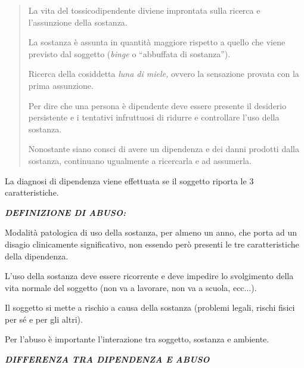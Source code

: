 \documentclass[]{article}
\begin{document}
\begin{quote}
La vita del tossicodipendente diviene improntata sulla ricerca e
l'assunzione della sostanza.

La sostanza è assunta in quantità maggiore rispetto a quello che viene
previsto dal soggetto (\emph{binge} o ``abbuffata di sostanza'').

Ricerca della cosiddetta \emph{luna di miele,} ovvero la sensazione
provata con la prima assunzione.

Per dire che una persona è dipendente deve essere presente il desiderio
persistente e i tentativi infruttuosi di ridurre e controllare l'uso
della sostanza.

Nonostante siano consci di avere un dipendenza e dei danni prodotti
dalla sostanza, continuano ugualmente a ricercarla e ad assumerla.
\end{quote}

La diagnosi di dipendenza viene effettuata se il soggetto riporta le 3
caratteristiche.

\textbf{\emph{DEFINIZIONE DI ABUSO:}}

Modalità patologica di uso della sostanza, per almeno un anno, che porta
ad un disagio clinicamente significativo, non essendo però presenti le
tre caratteristiche della dipendenza.

L'uso della sostanza deve essere ricorrente e deve impedire lo
svolgimento della vita normale del soggetto (non va a lavorare, non va a
scuola, ecc...).

Il soggetto si mette a rischio a causa della sostanza (problemi legali,
rischi fisici per sé e per gli altri).

Per l'abuso è importante l'interazione tra soggetto, sostanza e
ambiente.

\textbf{\emph{DIFFERENZA TRA DIPENDENZA E ABUSO}}
\end{document}
